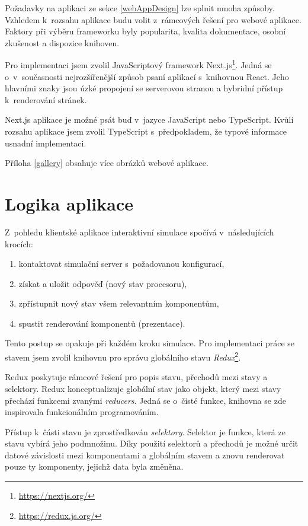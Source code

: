 Požadavky na aplikaci ze sekce \ref{webAppDesign} lze splnit mnoha způsoby.
Vzhledem k~rozsahu aplikace budu volit z~rámcových řešení pro webové aplikace.
Faktory při výběru frameworku byly popularita, kvalita dokumentace, osobní zkušenost a dispozice knihoven.

Pro implementaci jsem zvolil JavaScriptový framework Next.js\footnote{\url{https://nextjs.org/}}.
Jedná se o~v~současnosti nejrozšířenější způsob psaní aplikací s~knihovnou React.
Jeho hlavními znaky jsou úzké propojení se serverovou stranou a hybridní přístup k~renderování stránek.

Next.js aplikace je možné psát buď v~jazyce JavaScript nebo TypeScript.
Kvůli rozsahu aplikace jsem zvolil TypeScript s~předpokladem, že typové informace usnadní implementaci.

Příloha \ref{gallery} obsahuje více obrázků webové aplikace.

\section{Logika aplikace}

Z~pohledu klientské aplikace interaktivní simulace spočívá v~následujících krocích: 
\begin{enumerate}
    \item kontaktovat simulační server s~požadovanou konfigurací,
    \item získat a uložit odpověď (nový stav procesoru),
    \item zpřístupnit nový stav všem relevantním komponentům,
    \item spustit renderování komponentů (prezentace).
\end{enumerate}
Tento postup se opakuje při každém kroku simulace.
Pro implementaci práce se stavem jsem zvolil knihovnu pro správu globálního stavu \emph{Redux}\footnote{\url{https://redux.js.org/}}.

Redux poskytuje rámcové řešení pro popis stavu, přechodů mezi stavy a selektory.
Redux konceptualizuje globální stav jako objekt, který mezi stavy přechází funkcemi zvanými \emph{reducers}.
Jedná se o~čisté funkce, knihovna se zde inspirovala funkcionálním programováním.

Přístup k~části stavu je zprostředkován \emph{selektory}.
Selektor je funkce, která ze stavu vybírá jeho podmnožinu. 
Díky použití selektorů a přechodů je možné určit datové závislosti mezi komponentami a globálním stavem a znovu renderovat pouze ty komponenty, jejichž data byla změněna.

